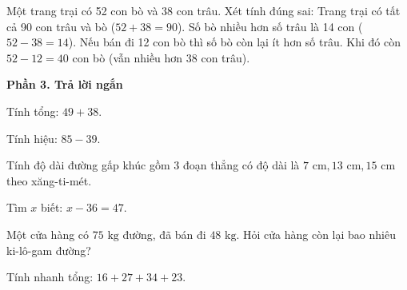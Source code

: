 \begin{ex} %
Một trang trại có 52 con bò và 38 con trâu. Xét tính đúng sai:
\choiceTF
{\True Trang trại có tất cả 90 con trâu và bò ($52 + 38 = 90$).}
{\True Số bò nhiều hơn số trâu là 14 con ($52 - 38 = 14$).}
{Nếu bán đi 12 con bò thì số bò còn lại ít hơn số trâu.}
{\True Khi đó còn $52 - 12 = 40$ con bò (vẫn nhiều hơn 38 con trâu).}
\end{ex}

\textbf{Phần 3. Trả lời ngắn}

\begin{ex} %
Tính tổng: $49 + 38$.
\end{ex}

\begin{ex} %
Tính hiệu: $85 - 39$.
\end{ex}

\begin{ex} %
Tính độ dài đường gấp khúc gồm 3 đoạn thẳng có độ dài là $7\text{ cm}, 13\text{ cm}, 15\text{ cm}$ theo xăng-ti-mét.
\end{ex}

\begin{ex} %
Tìm $x$ biết: $x - 36 = 47$.
\end{ex}

\begin{ex} %
Một cửa hàng có $75\text{ kg}$ đường, đã bán đi $48\text{ kg}$. Hỏi cửa hàng còn lại bao nhiêu ki-lô-gam đường?
\end{ex}

\begin{ex} %
Tính nhanh tổng: $16 + 27 + 34 + 23$.
\end{ex}

